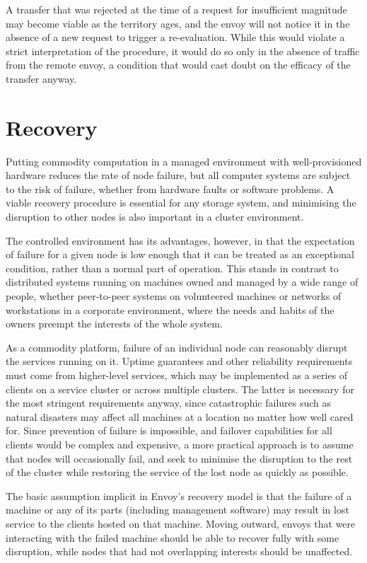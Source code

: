 A transfer that was rejected at the time of a request for insufficient magnitude may become viable as the territory ages, and the envoy will not notice it in the absence of a new request to trigger a re-evaluation. While this would violate a strict interpretation of the procedure, it would do so only in the absence of traffic from the remote envoy, a condition that would cast doubt on the efficacy of the transfer anyway.

\section{Recovery}\label{sec:envoy-recovery}

Putting commodity computation in a managed environment with well-provisioned hardware reduces the rate of node failure, but all computer systems are subject to the risk of failure, whether from hardware faults or software problems. A viable recovery procedure is essential for any storage system, and minimising the disruption to other nodes is also important in a cluster environment.

The controlled environment has its advantages, however, in that the expectation of failure for a given node is low enough that it can be treated as an exceptional condition, rather than a normal part of operation. This stands in contrast to distributed systems running on machines owned and managed by a wide range of people, whether peer-to-peer systems on volunteered machines or networks of workstations in a corporate environment, where the needs and habits of the owners preempt the interests of the whole system.

As a commodity platform, failure of an individual node can reasonably disrupt the services running on it. Uptime guarantees and other reliability requirements must come from higher-level services, which may be implemented as a series of clients on a service cluster or across multiple clusters. The latter is necessary for the most stringent requirements anyway, since catastrophic failures such as natural disasters may affect all machines at a location no matter how well cared for. Since prevention of failure is impossible, and failover capabilities for all clients would be complex and expensive, a more practical approach is to assume that nodes will occasionally fail, and seek to minimise the disruption to the rest of the cluster while restoring the service of the lost node as quickly as possible.

The basic assumption implicit in Envoy's recovery model is that the failure of a machine or any of its parts (including management software) may result in lost service to the clients hosted on that machine. Moving outward, envoys that were interacting with the failed machine should be able to recover fully with some disruption, while nodes that had not overlapping interests should be unaffected.

